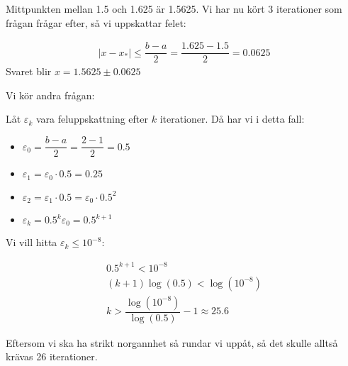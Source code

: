 \noindent Mittpunkten mellan 1.5 och 1.625 är 1.5625. Vi har nu kört 3 iterationer som frågan frågar efter, så vi uppskattar felet:


\begin{equation*}
  \begin{gathered}
    \left|x-x_*\right|\leq\dfrac{b-a}{2}=\dfrac{1.625-1.5}{2}=0.0625
  \end{gathered}
\end{equation*}
\noindent Svaret blir $x = 1.5625\pm 0.0625$
\par\bigskip
\noindent Vi kör andra frågan:
\par\bigskip
\noindent Låt $\varepsilon_k$ vara feluppskattning efter $k$ iterationer. Då har vi i detta fall:
\par\bigskip
\begin{itemize}
  \item $\varepsilon_0 = \dfrac{b-a}{2}= \dfrac{2-1}{2} = 0.5$
  \item $\varepsilon_1 = \varepsilon_0\cdot0.5=0.25$
  \item $\varepsilon_2 = \varepsilon_1\cdot0.5 = \varepsilon_0\cdot0.5^2$
  \item $\varepsilon_k = 0.5^k\varepsilon_0 = 0.5^{k+1}$
\end{itemize}
\par\bigskip
\noindent Vi vill hitta $\varepsilon_k\leq10^{-8}$:

\begin{equation*}
  \begin{gathered}
    0.5^{k+1}<10^{-8}\\
    (k+1)\log(0.5)<\log(10^{-8})\\
    k > \dfrac{\log(10^{-8})}{\log(0.5)}-1\approx 25.6
  \end{gathered}
\end{equation*}
\par\bigskip
\noindent Eftersom vi ska ha strikt norgannhet så rundar vi uppåt, så det skulle alltså krävas 26 iterationer.









